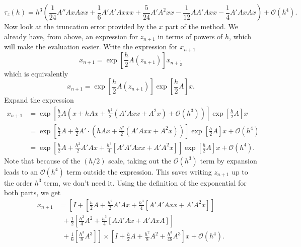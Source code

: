 \begin{equation}
    \tau_z(h) = h^3 \left( \frac{1}{24}A''AxAxx + \frac{1}{6}A'A'A xxx + \frac{5}{24} A' A^2 xx - \frac{1}{12}A A' A xx - \frac{1}{4}A' Ax Ax \right) + \mathcal{O}(h^4).
    \label{eqn:strangtruncz}
\end{equation}
Now look at the truncation error provided by the $x$ part of the method.
We already have, from above, an expression for $z_{n+1}$ in terms of powers of $h$, which will make the evaluation easier.
Write the expression for $x_{n+1}$
\begin{equation*}
    x_{n+1} = \exp \left[ \frac{h}{2} A(z_{n+1}) \right] x_{n+\frac{1}{2}}
\end{equation*}
which is equivalently
\begin{equation}
    x_{n+1} = \exp \left[ \frac{h}{2} A(z_{n+1}) \right] \exp \left[ \frac{h}{2} A \right] x.
    \label{eqn:strangx}
\end{equation}
Expand the expression
\begin{align*}
    x_{n+1} &= \exp \left[
        \frac{h}{2}A \left( x + h Ax + \frac{h^2}{2} \left( A' A xx + A^2 x \right) + \mathcal{O}(h^3) \right)
    \right] \exp \left[
        \frac{h}{2}A
    \right] x \\
    &= \exp \left[
        \frac{h}{2}A + \frac{h}{2} A' \cdot \left( h Ax + \frac{h^2}{2}\left( A' A xx + A^2 x \right) \right)
    \right] \exp \left[
        \frac{h}{2}A
    \right] x + \mathcal{O}(h^4) \\
    &= \exp \left[
        \frac{h}{2}A + \frac{h^2}{2}A'Ax + \frac{h^3}{4} \left[ A' A' A xx + A' A^2 x \right]
    \right] \exp \left[
        \frac{h}{2}A
    \right] x + \mathcal{O}(h^4).
\end{align*}
Note that because of the $(h/2)$ scale, taking out the $\mathcal{O}(h^3)$ term by expansion leads to an $\mathcal{O}(h^4)$ term outside the expression.
This saves writing $z_{n+1}$ up to the order $h^3$ term, we don't need it.
Using the definition of the exponential for both parts, we get
\begin{align*}
    x_{n+1} &= \left[
        I + \left[ \frac{h}{2}A + \frac{h^2}{2} A' Ax + \frac{h^3}{4} \left[ A' A' A xx + A' A^2 x \right] \right] \right. \\
        &~~ + \frac{1}{2}\left[ \frac{h^2}{4}A^2 + \frac{h^3}{4} \left[ AA'Ax + A' AxA \right] \right] \\
        &~~ + \left. \frac{1}{6} \left[ \frac{h^3}{8}A^3 \right]
    \right] \times \left[
        I + \frac{h}{2}A + \frac{h^2}{8}A^2 + \frac{h^3}{48}A^3
    \right]x + \mathcal{O}(h^4).
\end{align*}
